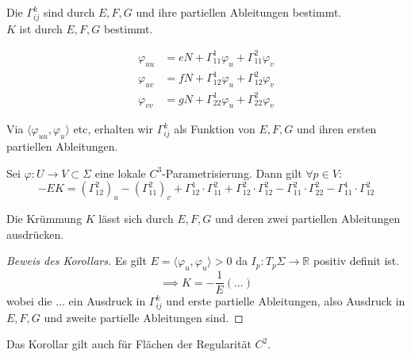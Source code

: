 \documentclass[../main.tex]{subfiles}
\begin{document}
\begin{consequence}
    Die $\Gamma_{ij}^{k}$ sind durch $E,F,G$ und ihre partiellen Ableitungen bestimmt.\\
    $K$ ist durch $E,F,G$ bestimmt.
\end{consequence}
\begin{recall}
    \begin{align*}
        \varphi_{uu} &= eN+\Gamma_{11}^{1}\varphi_{u} + \Gamma_{11}^{2}\varphi_{v}\\
        \varphi_{uv} &= fN+\Gamma_{12}^{1}\varphi_{u} + \Gamma_{12}^{2}\varphi_{v}\\
        \varphi_{vv} &= gN+\Gamma_{22}^{1}\varphi_{u} + \Gamma_{22}^{2}\varphi_{v}
    \end{align*}
\end{recall}
Via $\langle\varphi_{uu},\varphi_{u}\rangle$ etc, erhalten wir $\Gamma_{ij}^{k}$ als Funktion von $E,F,G$ und ihren ersten partiellen Ableitungen.
\begin{lemma}
    Sei $\varphi:U\to V\subset\Sigma$ eine lokale $C^{3}$-Parametrisierung. Dann gilt $\forall p\in V:$
    $$-E K = (\Gamma_{12}^{2})_{u}-(\Gamma_{11}^{2})_{v}+\Gamma_{12}^{1}\cdot\Gamma_{11}^{2}+\Gamma_{12}^{2}\cdot\Gamma_{12}^{2}-\Gamma_{11}^{2}\cdot\Gamma_{22}^{2}-\Gamma_{11}^{1}\cdot\Gamma_{12}^{2}$$
\end{lemma}
\begin{corollary}
    Die Krümmung $K$ lässt sich durch $E,F,G$ und deren zwei partiellen Ableitungen ausdrücken.
\end{corollary}
\begin{proof}[Beweis des Korollars]
    Es gilt $E=\langle\varphi_{u},\varphi_{u}\rangle > 0$ da $I_{p}:T_{p}\Sigma\to\mathbb{R}$ positiv definit ist.
    $$\implies K = -\frac{1}{E}(\dots)$$ wobei die $\dots$ ein Ausdruck in $\Gamma_{ij}^{k}$ und erste partielle Ableitungen, also Ausdruck in $E,F,G$ und zweite partielle Ableitungen sind.
\end{proof}
\begin{remark}
    Das Korollar gilt auch für Flächen der Regularität $C^{2}$.
\end{remark}
\end{document}
